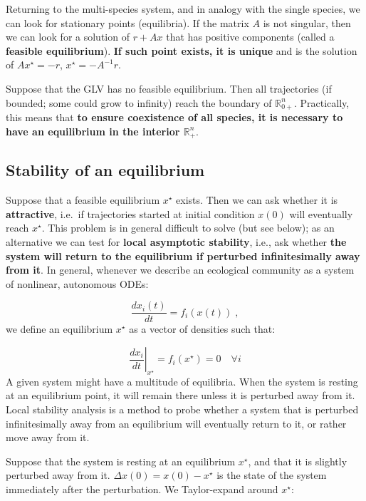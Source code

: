 \documentclass[]{book}
\begin{document}
Returning to the multi-species system, and in analogy with the single species, we can look for stationary points (equilibria). If the matrix \(A\) is not singular, then we can look for a solution of \(r + Ax\) that has positive components (called a \textbf{feasible equilibrium}). \textbf{If such point exists, it is unique} and is the solution of \(Ax^\star = -r\), \(x^\star = -A^{-1}r\).

Suppose that the GLV has no feasible equilibrium. Then all trajectories (if bounded; some could grow to infinity) reach the boundary of \(\mathbb R^n_{0+}\). Practically, this means that \textbf{to ensure coexistence of all species, it is necessary to have an equilibrium in the interior \(\mathbb R^n_{+}\)}.

\hypertarget{stability-of-an-equilibrium}{%
\subsection{Stability of an equilibrium}\label{stability-of-an-equilibrium}}

Suppose that a feasible equilibrium \(x^\star\) exists. Then we can ask whether it is \textbf{attractive}, i.e.~if trajectories started at initial condition \(x(0)\) will eventually reach \(x^\star\). This problem is in general difficult to solve (but see below); as an alternative we can test for \textbf{local asymptotic stability}, i.e., ask whether \textbf{the system will return to the equilibrium if perturbed infinitesimally away from it}. In general, whenever we describe an ecological community as a system of nonlinear, autonomous ODEs:

\[
\frac{d x_i (t)}{d t} = f_i (x(t)) \;,
\]
we define an equilibrium \(x^\star\) as a vector of densities such that:

\[
\left. \frac{d x_i}{d t} \right|_{{x}^\star} = f_i
({x}^\star) = 0 \quad \forall i
\]
A given system might have a multitude of equilibria. When the system is resting at an equilibrium point, it will remain there unless it is perturbed away from it. Local stability analysis is a method to probe whether a system that is perturbed infinitesimally away from an equilibrium will eventually return to it, or rather move away from it.

Suppose that the system is resting at an equilibrium \(x^\star\), and that it is slightly perturbed away from it. \(\Delta x(0) = x(0)-x^\star\) is the state of the system immediately after the perturbation. We Taylor-expand around \(x^\star\):
\end{document}
